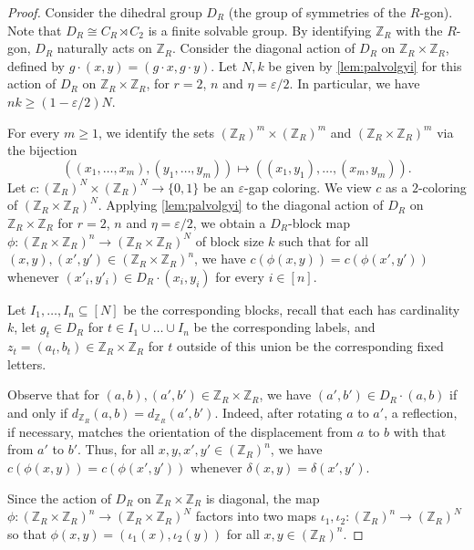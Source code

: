 \documentclass[11pt]{article}
\theoremstyle{remark}
\begin{document}
\begin{proof}
    Consider the dihedral group $D_R$ (the group of symmetries of the $R$-gon). 
    Note that $D_R \cong C_R \rtimes C_2$ is a finite solvable group.
    By identifying $\mathbb{Z}_R$ with the $R$-gon, $D_R$ naturally acts on $\mathbb{Z}_R$.
    Consider the diagonal action of $D_R$ on $\mathbb{Z}_R \times \mathbb{Z}_R$, defined by $g \cdot (x, y) = (g \cdot x, g \cdot y)$.
    Let $N, k$ be given by \cref{lem:palvolgyi} for this action of $D_R$ on $\mathbb{Z}_R \times \mathbb{Z}_R$, for $r=2$, $n$ and $\eta = \varepsilon/2$.
    In particular, we have $nk \geq (1-\varepsilon/2)N$.
    
    For every $m \geq 1$, we identify the sets $(\mathbb{Z}_R)^m \times (\mathbb{Z}_R)^m$ and $(\mathbb{Z}_R \times \mathbb{Z}_R)^m$ via the bijection \[((x_1, \ldots, x_m), (y_1, \ldots, y_m)) \mapsto ((x_1, y_1), \ldots, (x_m, y_m)).\]
    Let $c : (\mathbb{Z}_R)^N \times (\mathbb{Z}_R)^N \to \{0, 1\}$ be an $\varepsilon$-gap coloring.
    We view $c$ as a $2$-coloring of $(\mathbb{Z}_R \times \mathbb{Z}_R)^N$.
    Applying \cref{lem:palvolgyi} to the diagonal action of $D_R$ on $\mathbb{Z}_R \times \mathbb{Z}_R$ for $r=2$, $n$ and $\eta = \varepsilon/2$, we obtain a $D_R$-block map $\phi : (\mathbb{Z}_R \times \mathbb{Z}_R)^n \to (\mathbb{Z}_R \times \mathbb{Z}_R)^N$ of block size $k$ such that for all $(x, y), (x', y') \in (\mathbb{Z}_R \times \mathbb{Z}_R)^n$, we have $c(\phi(x, y)) = c(\phi(x', y'))$ whenever $(x'_i, y'_i) \in D_{R} \cdot (x_i, y_i)$ for every $i \in [n]$.
    
    Let $I_1, \ldots, I_n \subseteq [N]$ be the corresponding blocks, recall that each has cardinality $k$, let $g_{t} \in D_R$ for $t \in I_1 \cup \ldots \cup I_n$ be the corresponding labels, and $z_{t} = (a_t, b_t) \in \mathbb{Z}_R \times \mathbb{Z}_R$ for $t$ outside of this union be the corresponding fixed letters.
    
    Observe that for $(a, b), (a', b') \in \mathbb{Z}_R \times \mathbb{Z}_R$, we have $(a', b') \in D_R \cdot (a, b)$ if and only if $d_{\mathbb{Z}_R}(a, b) = d_{\mathbb{Z}_R}(a', b')$.
    Indeed, after rotating $a$ to $a'$, a reflection, if necessary, matches the orientation of the displacement from $a$ to $b$ with that from $a'$ to $b'$.
    Thus, for all $x, y, x', y' \in (\mathbb{Z}_R)^n$, we have $c(\phi(x, y)) = c(\phi(x', y'))$ whenever $\delta(x, y) = \delta(x', y')$.
    
    Since the action of $D_R$ on $\mathbb{Z}_R \times \mathbb{Z}_R$ is diagonal, the map $\phi : (\mathbb{Z}_R \times \mathbb{Z}_R)^n \to (\mathbb{Z}_R \times \mathbb{Z}_R)^N$ factors into two maps $\iota_1, \iota_2 : (\mathbb{Z}_R)^n \to (\mathbb{Z}_R)^N$ so that $\phi(x, y) = (\iota_1(x), \iota_2(y))$ for all $x, y \in (\mathbb{Z}_R)^n$.
    

\end{proof}
\end{document}
